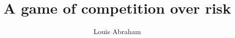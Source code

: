 \documentclass[preprint,12pt,authoryear]{elsarticle}
\theoremstyle{definition}
\begin{document}
\begin{frontmatter}



\title{A game of competition over risk}


\author[inst1,inst2]{Louis Abraham}

\address[inst1]{Université Paris 1 Panthéon--Sorbonne}

\address[inst2]{Association Française d'Épargne et de Retraite (AFER)}

            




\end{frontmatter}
\end{document}
